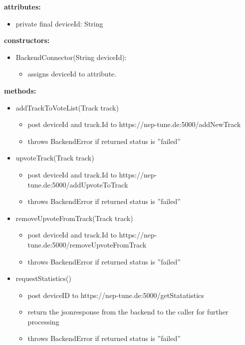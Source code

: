 \documentclass[oneside, ngerman]{sdqtechreport}
\begin{document}
 \textbf{attributes:}
 \begin{itemize}
     \item private final deviceId: String 
 \end{itemize}
 \textbf{constructors:}
 \begin{itemize}
     \item BackendConnector(String deviceId):
     \begin{itemize}
         \item assigns deviceId to attribute.
     \end{itemize}
 \end{itemize}
 \textbf{methods:}
 \begin{itemize}
     \item addTrackToVoteList(Track track) 
     \begin{itemize}
         \item post deviceId and track.Id to https://nep-tune.de:5000/addNewTrack
         \item throws BackendError if returned status is ''failed''
     \end{itemize}
     \item upvoteTrack(Track track)
     \begin{itemize}
         \item post deviceId and track.Id to https://nep-tune.de:5000/addUpvoteToTrack
         \item throws BackendError if returned status is ''failed''
     \end{itemize}
     \item removeUpvoteFromTrack(Track track)
     \begin{itemize}
         \item post deviceId and track.Id to https://nep-tune.de:5000/removeUpvoteFromTrack
          \item throws BackendError if returned status is ''failed''
     \end{itemize}
     \item requestStatistics()
     \begin{itemize}
         \item post deviceID to https://nep-tune.de:5000/getStatatistics
         \item return the jsonresponse from the backend to the caller for further processing
         \item throws BackendError if returned status is ''failed''
     \end{itemize}
     

\end{itemize}
\end{document}
